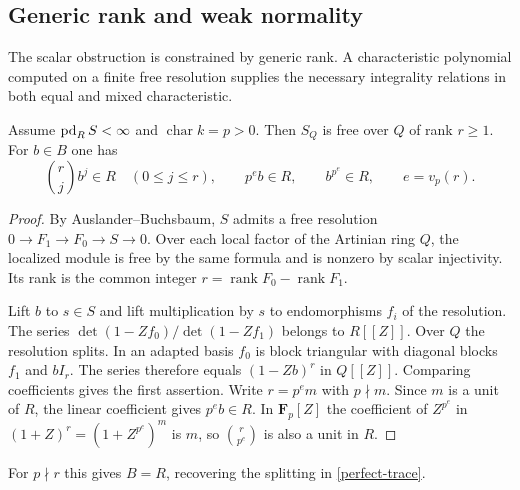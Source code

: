 \subsection{Generic rank and weak normality}\label{roots}
The scalar obstruction is constrained by generic rank.  A characteristic
polynomial computed on a finite free resolution supplies the necessary
integrality relations in both equal and mixed characteristic.
\begin{proposition}\label{rank}
Assume $\operatorname{pd}_R S<\infty$ and $\operatorname{char} k=p>0$. Then $S_Q$ is free over $Q$ of rank $r\ge1$. For $b\in B$ one has
\[
 \binom rj b^j\in R\quad(0\le j\le r),\qquad
 p^e b\in R,\qquad b^{p^e}\in R,\qquad e=v_p(r).
\]
\end{proposition}
\begin{proof}
By Auslander--Buchsbaum, $S$ admits a free resolution $0\to F_1\to F_0\to S\to0$. Over each local factor of the Artinian ring $Q$, the localized module is free by the same formula and is nonzero by scalar injectivity. Its rank is the common integer $r=\operatorname{rank} F_0-\operatorname{rank} F_1$.

Lift $b$ to $s\in S$ and lift multiplication by $s$ to endomorphisms $f_i$ of the resolution. The series $\det(1-Zf_0)/\det(1-Zf_1)$ belongs to $R[[Z]]$. Over $Q$ the resolution splits. In an adapted basis $f_0$ is block triangular with diagonal blocks $f_1$ and $bI_r$. The series therefore equals $(1-Zb)^r$ in $Q[[Z]]$. Comparing coefficients gives the first assertion. Write $r=p^e m$ with $p\nmid m$. Since $m$ is a unit of $R$, the linear coefficient gives $p^e b\in R$. In $\mathbf F_p[Z]$ the coefficient of $Z^{p^e}$ in $(1+Z)^r=(1+Z^{p^e})^m$ is $m$, so $\binom r{p^e}$ is also a unit in $R$.
\end{proof}
For $p\nmid r$ this gives $B=R$, recovering the splitting in \eqref{perfect-trace}. 

